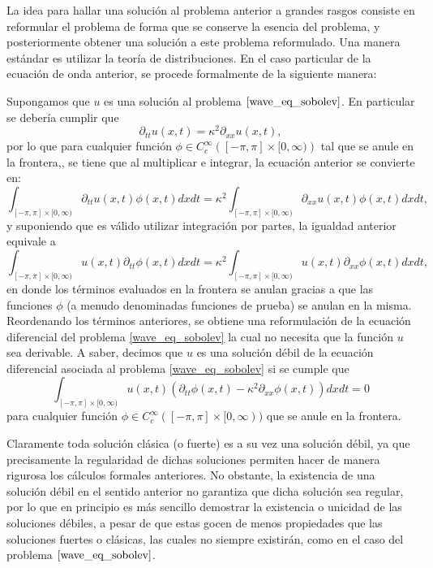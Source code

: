 La idea para hallar una solución al problema anterior a grandes rasgos consiste en reformular el problema de forma que se conserve la esencia del problema, y posteriormente obtener una solución a este problema reformulado. Una manera estándar es utilizar la teoría de distribuciones. En el caso particular de la ecuación de onda anterior, se procede formalmente de la siguiente manera:

Supongamos que $u$ es una solución al problema $\eqref{wave_eq_sobolev}$. En particular se debería cumplir que 
\[
\partial_{tt}u(x,t)=\kappa^2\partial_{xx}u(x,t),
\]
por lo que para cualquier función $\phi\in C^{\infty}_c\left([-\pi,\pi]\times [0,\infty)\right)$ tal que se anule en la frontera,, se tiene que al multiplicar e integrar, la ecuación anterior se convierte en:
\[
    \int_{[-\pi,\pi]\times [0,\infty)}\partial_{tt}u(x,t)\phi(x,t)dx dt=\kappa^2\int_{[-\pi,\pi]\times [0,\infty)}\partial_{xx}u(x,t)\phi(x,t)dx dt,
\]
y suponiendo que es válido utilizar integración por partes, la igualdad anterior equivale a
\[
\int_{[-\pi,\pi]\times [0,\infty)}u(x,t)\partial_{tt}\phi(x,t)dx dt=\kappa^2\int_{[-\pi,\pi]\times [0,\infty)}u(x,t)\partial_{xx}\phi(x,t)dx dt,
\]
en donde los términos evaluados en la frontera se anulan gracias a que las funciones $\phi$ (a menudo denominadas funciones de prueba) se anulan en la misma. Reordenando los términos anteriores, se obtiene una reformulación de la ecuación diferencial del problema \eqref{wave_eq_sobolev} la cual no necesita que la función $u$ sea derivable. A saber, decimos que $u$ es una solución débil de la ecuación diferencial asociada al problema \eqref{wave_eq_sobolev} si se cumple que 
\[
\int_{[-\pi,\pi]\times [0,\infty)}u(x,t)(\partial_{tt}\phi(x,t)-\kappa^2\partial_{xx}\phi(x,t))dx dt=0    
\]
para cualquier función $\phi\in C^{\infty}_c([-\pi,\pi]\times [0,\infty))$ que se anule en la frontera.

Claramente toda solución clásica (o fuerte) es a su vez una solución débil, ya que precisamente la regularidad de dichas soluciones permiten hacer de manera rigurosa los cálculos formales anteriores.
No obstante, la existencia de una solución débil en el sentido anterior no garantiza que dicha solución sea regular, por lo que en principio es más sencillo demostrar la existencia o unicidad de las soluciones débiles, a pesar de que estas gocen de menos propiedades que las soluciones fuertes o clásicas, las cuales no siempre existirán, como en el caso del problema $\eqref{wave_eq_sobolev}$.

